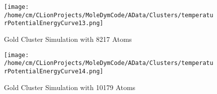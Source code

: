 \begin{figure}[!h] 
    \begin{center} 
        \texttt{[image: /home/cm/CLionProjects/MoleDymCode/AData/Clusters/temperaturPotentialEnergyCurve13.png]} 
    \end{center} 
    \caption[Gold Cluster Simulation with 8217 Atoms]{Gold Cluster Simulation with 8217 Atoms} 
    \label{GoldClusterSimulationTemperaturEnergy8217} 
\end{figure} 
 
\begin{figure}[!h] 
    \begin{center} 
        \texttt{[image: /home/cm/CLionProjects/MoleDymCode/AData/Clusters/temperaturPotentialEnergyCurve14.png]} 
    \end{center} 
    \caption[Gold Cluster Simulation with 10179 Atoms]{Gold Cluster Simulation with 10179 Atoms} 
    \label{GoldClusterSimulationTemperaturEnergy10179} 
\end{figure} 
 
